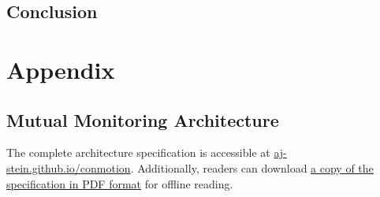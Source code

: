 \documentclass{jdf}
\begin{document}
\subsection{Conclusion}




\section{Appendix}

\subsection{Mutual Monitoring Architecture} \label{architecture}

The complete architecture specification is accessible at \href{https://aj-stein.github.io/conmotion/architecture.html}{aj-stein.github.io/conmotion}. Additionally, readers can download \href{https://aj-stein.github.io/conmotion/architecture.pdf}{a copy of the specification in PDF format} for offline reading.
\end{document}
